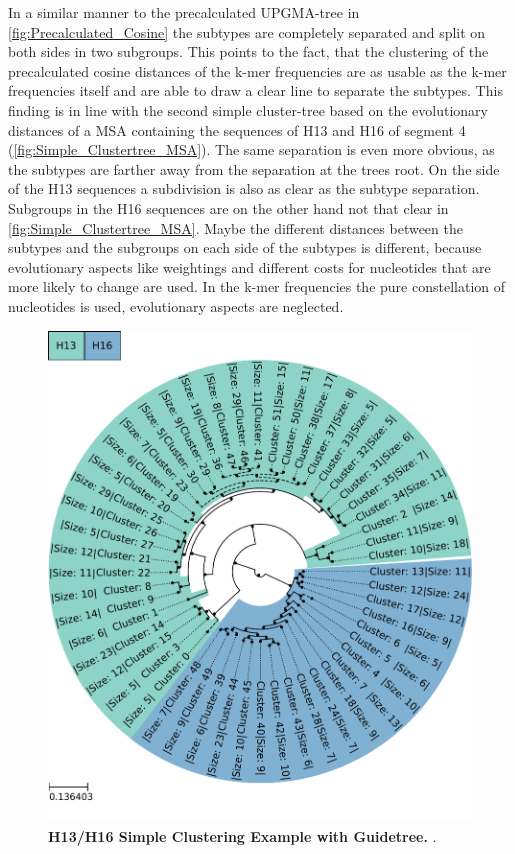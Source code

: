 In a similar manner to the precalculated \gls{UPGMA}-tree in \autoref{fig:Precalculated_Cosine} the subtypes are completely separated and split on both sides in two subgroups. This points to the fact, that the clustering of the precalculated cosine distances of the k-mer frequencies are as usable as the k-mer frequencies itself and are able to draw a clear line to separate the subtypes. This finding is in line with the second simple cluster-tree based on the evolutionary distances of a \gls{MSA} containing the sequences of H13 and H16 of segment 4 (\autoref{fig:Simple_Clustertree_MSA}). The same separation is even more obvious, as the subtypes are farther away from the separation at the trees root. On the side of the H13 sequences a subdivision is also as clear as the subtype separation. Subgroups in the H16 sequences are on the other hand not that clear in \autoref{fig:Simple_Clustertree_MSA}. Maybe the different distances between the subtypes and the subgroups on each side of the subtypes is different, because evolutionary aspects like weightings and different costs for nucleotides that are more likely to change are used. In the k-mer frequencies the pure constellation of nucleotides is used, evolutionary aspects are neglected.  

\begin{figure}[!hbt]
    \centering
    \includegraphics[width=\textwidth]{PCA/Clustertree_Segment_4_H_Focus.pdf}
    \caption[H13/H16 Simple Clustering Example with Guidetree]{\textbf{H13/H16 Simple Clustering Example with Guidetree.} .}
    \label{fig:Simple_Clustertree_MSA}
\end{figure}

